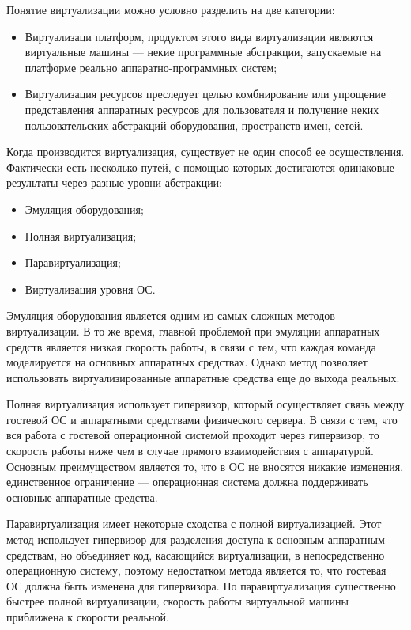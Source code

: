 Понятие виртуализации можно условно разделить на две категории:
\begin{itemize}
  \item Виртуализаци платформ, продуктом этого вида виртуализации являются виртуальные машины --- некие программные абстракции, запускаемые на платформе реально аппаратно-программных систем;
  \item Виртуализация ресурсов преследует целью комбнирование или упрощение представления аппаратных ресурсов для пользователя и получение неких пользовательских абстракций оборудования, пространств имен, сетей.
\end{itemize}

Когда производится виртуализация, существует не один способ ее осуществления.
Фактически есть несколько путей, с помощью которых достигаются одинаковые результаты через разные уровни абстракции: \cite{openvz-tutorial}
\begin{itemize}
  \item Эмуляция оборудования;
  \item Полная виртуализация;
  \item Паравиртуализация;
  \item Виртуализация уровня ОС.
\end{itemize}

Эмуляция оборудования является одним из самых сложных методов виртуализации.
В то же время, главной проблемой при эмуляции аппаратных средств является низкая скорость работы, в связи с тем, что каждая команда моделируется на основных аппаратных средствах. 
Однако метод позволяет использовать виртуализированные аппаратные средства еще до выхода реальных.

Полная виртуализация использует гипервизор, который осуществляет связь между гостевой ОС и аппаратными средствами физического сервера.
В связи с тем, что вся работа с гостевой операционной системой проходит через гипервизор, то скорость работы ниже чем в случае прямого взаимодействия с аппаратурой.
Основным преимуществом является то, что в ОС не вносятся никакие изменения, единственное ограничение --- операционная система должна поддерживать основные аппаратные средства.

Паравиртуализация имеет некоторые сходства с полной виртуализацией.
Этот метод использует гипервизор для разделения доступа к основным аппаратным средствам, но объединяет код, касающийся виртуализации, в непосредственно операционную систему, поэтому недостатком метода является то, что гостевая ОС должна быть изменена для гипервизора.
Но паравиртуализация существенно быстрее полной виртуализации, скорость работы виртуальной машины приближена к скорости реальной.

